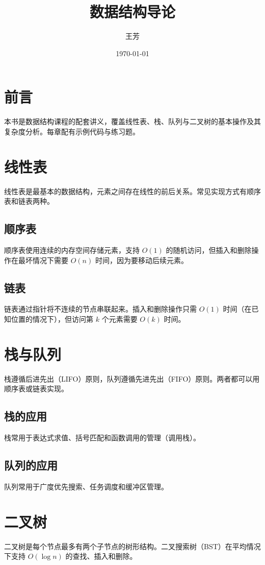 \documentclass[scheme=chinese,font=auto]{easybook}
\title{数据结构导论}
\author{王芳}
\date{\today}
\begin{document}
\frontmatter

\maketitle

\chapter*{前言}
本书是数据结构课程的配套讲义，覆盖线性表、栈、队列与二叉树的基本操作及其复杂度分析。每章配有示例代码与练习题。

\tableofcontents

\mainmatter

\chapter{线性表}

线性表是最基本的数据结构，元素之间存在线性的前后关系。常见实现方式有顺序表和链表两种。

\section{顺序表}

顺序表使用连续的内存空间存储元素，支持 $O(1)$ 的随机访问，但插入和删除操作在最坏情况下需要 $O(n)$ 时间，因为要移动后续元素。

\section{链表}

链表通过指针将不连续的节点串联起来。插入和删除操作只需 $O(1)$ 时间（在已知位置的情况下），但访问第 $k$ 个元素需要 $O(k)$ 时间。

\chapter{栈与队列}

栈遵循后进先出（LIFO）原则，队列遵循先进先出（FIFO）原则。两者都可以用顺序表或链表实现。

\section{栈的应用}

栈常用于表达式求值、括号匹配和函数调用的管理（调用栈）。

\section{队列的应用}

队列常用于广度优先搜索、任务调度和缓冲区管理。

\chapter{二叉树}

二叉树是每个节点最多有两个子节点的树形结构。二叉搜索树（BST）在平均情况下支持 $O(\log n)$ 的查找、插入和删除。
\end{document}
